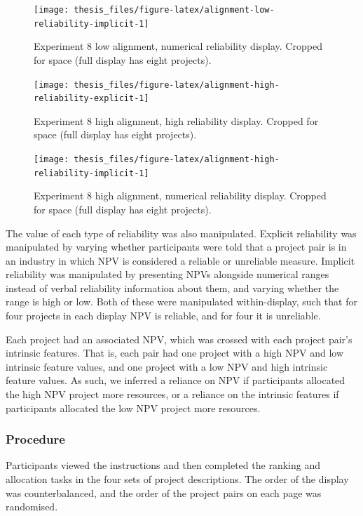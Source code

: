 \documentclass[a4paper, nobind, dvipsnames]{templates/ociamthesis}
\theoremstyle{definition}
\theoremstyle{definition}
\theoremstyle{definition}
\theoremstyle{definition}
\theoremstyle{remark}
\begin{document}
\begin{figure}
\texttt{[image: thesis\_files/figure-latex/alignment-low-reliability-implicit-1]} \caption{Experiment 8 low alignment, numerical reliability display. Cropped for space (full display has eight projects).}\label{fig:alignment-low-reliability-implicit}
\end{figure}

\begin{figure}
\texttt{[image: thesis\_files/figure-latex/alignment-high-reliability-explicit-1]} \caption{Experiment 8 high alignment, high reliability display. Cropped for space (full display has eight projects).}\label{fig:alignment-high-reliability-explicit}
\end{figure}

\begin{figure}
\texttt{[image: thesis\_files/figure-latex/alignment-high-reliability-implicit-1]} \caption{Experiment 8 high alignment, numerical reliability display. Cropped for space (full display has eight projects).}\label{fig:alignment-high-reliability-implicit}
\end{figure}

The value of each type of reliability was also manipulated. Explicit reliability
was manipulated by varying whether participants were told that a project pair is
in an industry in which NPV is considered a reliable or unreliable measure.
Implicit reliability was manipulated by presenting NPVs alongside numerical
ranges instead of verbal reliability information about them, and varying
whether the range is high or low. Both of these were manipulated within-display,
such that for four projects in each display NPV is reliable, and for four it is
unreliable.

Each project had an associated NPV, which was crossed with each project pair's
intrinsic features. That is, each pair had one project with a high NPV and low
intrinsic feature values, and one project with a low NPV and high intrinsic
feature values. As such, we inferred a reliance on NPV if participants allocated
the high NPV project more resources, or a reliance on the intrinsic features if
participants allocated the low NPV project more resources.

\hypertarget{procedure-12}{%
\subsubsection{Procedure}\label{procedure-12}}

Participants viewed the instructions and then completed the ranking and
allocation tasks in the four sets of project descriptions. The order of the
display was counterbalanced, and the order of the project pairs on each page was
randomised.
\end{document}
